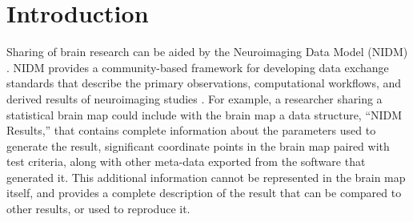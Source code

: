 \documentclass[twocolumn]{bmcart}%
\begin{document}
\begin{frontmatter}
\begin{fmbox}


	








%
\end{fmbox}%

\end{frontmatter}


\section{Introduction}\label{introduction}
Sharing of brain research can be aided by the Neuroimaging Data Model (NIDM) \cite{Keator2013-rc,noauthor_undated-jz,noauthor_undated-pr}. NIDM provides a community-based framework for developing data exchange standards that describe the primary observations, computational workflows, and derived results of neuroimaging studies \cite{noauthor_undated-jv}. For example, a researcher sharing a statistical brain map could include with the brain map a data structure, ``NIDM Results,'' that contains complete information about the parameters used to generate the result, significant coordinate points in the brain map paired with test criteria, along with other meta-data exported from the software that generated it. This additional information cannot be represented in the brain map itself, and provides a complete description of the result that can be compared to other results, or used to reproduce it. 
\end{document}
